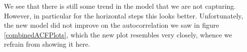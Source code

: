 We see that there is still some trend in the model that we are not capturing. However, in particular for the horizontal steps this looks better. Unfortunately, the new model did not improve on the autocorrelation  we saw in figure \ref{combinedACFPlots}, which the new plot resembles very closely, whence we refrain from showing it here.